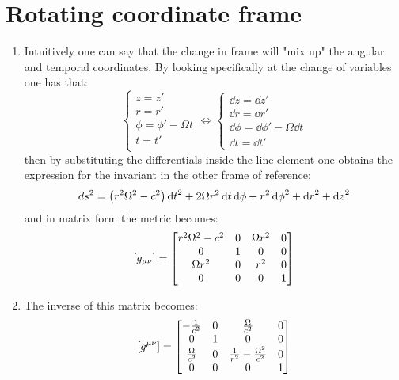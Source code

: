 \documentclass[11pt, oneside]{article}
\begin{document}
\section{Rotating coordinate frame}
\begin{enumerate}
\item Intuitively one can say that the change in frame will "mix up" the angular and temporal coordinates. By looking specifically at the change of variables one has that:
\[
	\begin{cases}
		z = z' \\
		r = r' \\
		\phi = \phi' - \Omega t \\
		t = t' \\ 
	\end{cases}
	\iff
	\begin{cases}
		\dd{z} = \dd{z'} \\
		\dd{r} = \dd{r'} \\
		\dd{\phi} = \dd{\phi'} - \Omega \dd{t} \\
		\dd{t} = \dd{t'}
	\end{cases}
\]
then by substituting the differentials inside the line element one obtains the expression for the invariant in the other frame of reference:
\[
	d s^2 = \qty(r^2\Omega^2 - c^2) \dd{t}^2 + 2\Omega r^2 \dd{t} \dd{\phi}+ r^2 \dd{\phi}^2 + \dd{r}^2 + \dd{z}^2
\]
and in matrix form the metric becomes:
\[
	\qty[g_{\mu\nu}] = 
	\begin{bmatrix}
		r^2\Omega^2 - c^2 & 0 &\Omega r^2 & 0 \\
		0 & 1 & 0 & 0 \\
		\Omega r^2 & 0 & r^2 & 0 \\
		0 & 0 & 0 & 1 \\
	\end{bmatrix}
\]

\item The inverse of this matrix becomes:
\[
	\qty[g^{\mu\nu}] = 
	\begin{bmatrix}
		-\frac{1}{c^{2}} & 0 & \frac{\Omega}{c^{2}} & 0 \\
		0 & 1 & 0 & 0 \\
		\frac{\Omega}{c^{2}} & 0 & \frac{1}{r^{2}} -\frac{\Omega^{2}}{c^{2}} & 0 \\
		0 & 0 & 0 & 1
	\end{bmatrix}
\]


\end{enumerate}
\end{document}
